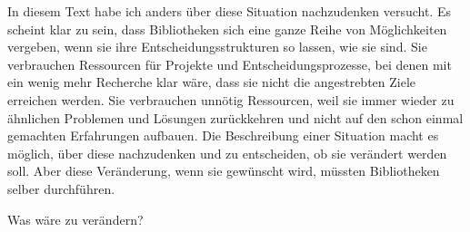 \documentclass[a4paper,
fontsize=11pt,
oneside,
numbers=noperiodatend,
parskip=half-,
bibliography=totoc,
final
]{scrartcl}
\begin{document}
In diesem Text habe ich anders über diese Situation nachzudenken
versucht. Es scheint klar zu sein, dass Bibliotheken sich eine ganze
Reihe von Möglichkeiten vergeben, wenn sie ihre Entscheidungsstrukturen
so lassen, wie sie sind. Sie verbrauchen Ressourcen für Projekte und
Entscheidungsprozesse, bei denen mit ein wenig mehr Recherche klar wäre,
dass sie nicht die angestrebten Ziele erreichen werden. Sie verbrauchen
unnötig Ressourcen, weil sie immer wieder zu ähnlichen Problemen und
Lösungen zurückkehren und nicht auf den schon einmal gemachten
Erfahrungen aufbauen. Die Beschreibung einer Situation macht es möglich,
über diese nachzudenken und zu entscheiden, ob sie verändert werden
soll. Aber diese Veränderung, wenn sie gewünscht wird, müssten
Bibliotheken selber durchführen.

Was wäre zu verändern?
\end{document}
